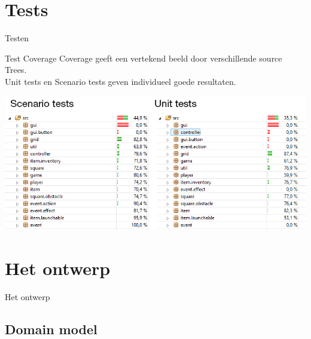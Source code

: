 \documentclass[t]{beamer}
\begin{document}
\section{Tests}

\begin{frame}{Testen}
\begin{multicols}{2}
\tableofcontents[currentsection]
\end{multicols}
\end{frame}

\begin{frame}{Test Coverage}
Coverage geeft een vertekend beeld door verschillende source Trees.\\
Unit tests en Scenario tests geven individueel goede resultaten.
\begin{center}
\includegraphics[scale=0.5]{images/test}
\end{center}
\end{frame}

\section{Het ontwerp}

\begin{frame}{Het ontwerp}
\begin{multicols}{2}
\tableofcontents[currentsection]
\end{multicols}
\end{frame}

\subsection{Domain model}
\end{document}
